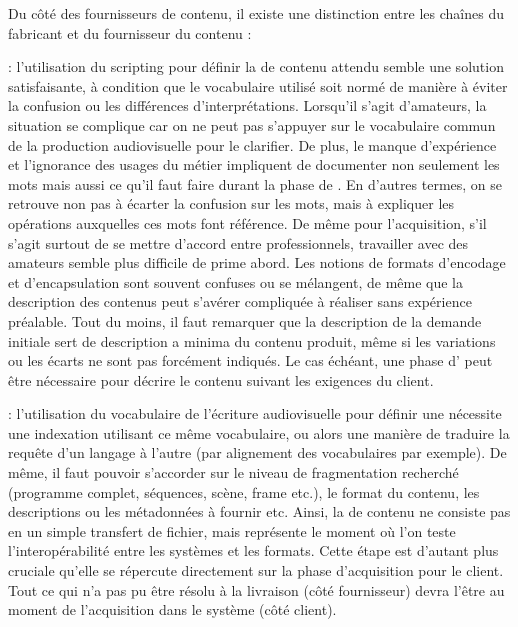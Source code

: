 Du côté des fournisseurs de contenu, il existe une distinction entre les chaînes du fabricant et du fournisseur du contenu :  

\begin{liste}
	\item {} : l'utilisation du scripting pour définir la  de contenu attendu semble une solution satisfaisante, à condition que le vocabulaire utilisé soit normé de manière à éviter la confusion ou les différences d'interprétations. 
    Lorsqu'il s'agit d'amateurs, la situation se complique car on ne peut pas s'appuyer sur le vocabulaire commun de la production audiovisuelle pour le clarifier. 
    De plus, le manque d'expérience et l'ignorance des usages du métier impliquent de documenter non seulement les mots mais aussi ce qu'il faut faire durant la phase de . 
    En d'autres termes, on se retrouve non pas à écarter la confusion sur les mots, mais à expliquer les opérations auxquelles ces mots font référence. 
    De même pour l'acquisition, s'il s'agit surtout de se mettre d'accord entre professionnels, travailler avec des amateurs semble plus difficile de prime abord. 
    Les notions de formats d'encodage et d'encapsulation sont souvent confuses ou se mélangent, de même que la description des contenus peut s'avérer compliquée à réaliser sans expérience préalable. 
    Tout du moins, il faut remarquer que la description de la demande initiale sert de description a minima du contenu produit, même si les variations ou les écarts ne sont pas forcément indiqués.
    Le cas échéant, une phase d' peut être nécessaire pour décrire le contenu suivant les exigences du client.\\

	\item {} : l'utilisation du vocabulaire de l'écriture audiovisuelle pour définir une  nécessite une indexation utilisant ce même vocabulaire, ou alors une manière de traduire la requête d'un langage à l'autre (par alignement des vocabulaires par exemple). 
	De même, il faut pouvoir s'accorder sur le niveau de fragmentation recherché (programme complet, séquences, scène, frame etc.), le format du contenu, les descriptions ou les métadonnées à fournir etc.
	Ainsi, la  de contenu ne consiste pas en un simple transfert de fichier, mais représente le moment où l'on teste l'interopérabilité entre les systèmes et les formats. 
	Cette étape est d'autant plus cruciale qu'elle se répercute directement sur la phase d'acquisition pour le client. 
	Tout ce qui n'a pas pu être résolu à la livraison (côté fournisseur) devra l'être au moment de l'acquisition dans le système (côté client).\\
\end{liste}



